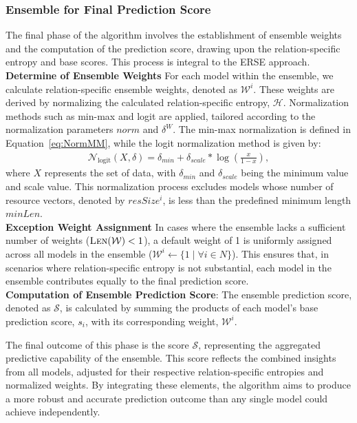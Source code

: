 \documentclass{article}
\begin{document}
\subsubsection{Ensemble for Final Prediction Score}
The final phase of the algorithm involves the establishment of ensemble weights and the computation of the prediction score, drawing upon the relation-specific entropy and base scores. This process is integral to the ERSE approach.
\\
\textbf{Determine of Ensemble Weights} For each model within the ensemble, we calculate relation-specific ensemble weights, denoted as $\mathcal{W}^i$. These weights are derived by normalizing the calculated relation-specific entropy, $\mathcal{H}$. Normalization methods such as min-max and logit are applied, tailored according to the normalization parameters $norm$ and $\delta^{W}$. The min-max normalization is defined in Equation~\ref{eq:NormMM}, while the logit normalization method is given by:
\begin{align}
\label{eq:NormLogit}
    \mathcal{N}_{\text{logit}}(X, \delta) =  \delta_{min} + \delta_{scale}*\log\left(\frac{x}{1 - x}\right),
\end{align}%
where $X$ represents the set of data, with $\delta_{min}$ and $\delta_{scale}$ being the minimum value and scale value. This normalization process excludes models whose number of resource vectors, denoted by $resSize^{i}$, is less than the predefined minimum length $minLen$.
\\
\textbf{Exception Weight Assignment} In cases where the ensemble lacks a sufficient number of weights ($\Call{Len}{\mathcal{W}} < 1$), a default weight of 1 is uniformly assigned across all models in the ensemble ($\mathcal{W}^i \leftarrow \{1\;|\; \forall i \in N\}$). This ensures that, in scenarios where relation-specific entropy is not substantial, each model in the ensemble contributes equally to the final prediction score.
\\
\textbf{Computation of Ensemble Prediction Score}: The ensemble prediction score, denoted as $\mathcal{S}$, is calculated by summing the products of each model's base prediction score, $s\acute{}_i$, with its corresponding weight, $\mathcal{W}^i$. 

The final outcome of this phase is the score $\mathcal{S}$, representing the aggregated predictive capability of the ensemble. This score reflects the combined insights from all models, adjusted for their respective relation-specific entropies and normalized weights. By integrating these elements, the algorithm aims to produce a more robust and accurate prediction outcome than any single model could achieve independently.
\end{document}
